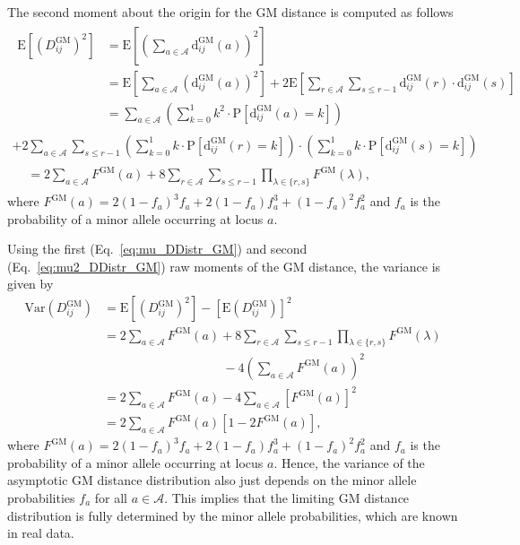 \documentclass[aos]{imsart}
\begin{document}
The second moment about the origin for the GM distance is computed as follows
%
\begin{equation}\label{eq:mu2_DDistr_GM}
\begin{split}
\begin{aligned}
\text{E}\left[\left(D^\text{GM}_{ij}\right)^2\right] &= \text{E}\left[\left(\sum_{a \in \mathcal{A}} \text{d}^\text{GM}_{ij}(a)\right)^2\right] \\
&= \text{E}\left[\sum_{a \in \mathcal{A}} \left(\text{d}^\text{GM}_{ij}(a)\right)^2\right] + 2 \text{E}\left[\sum_{r \in \mathcal{A}} \sum_{s \leq r - 1} \text{d}^\text{GM}_{ij}(r) \cdot \text{d}^\text{GM}_{ij}(s)\right] \\
&= \sum_{a \in \mathcal{A}} \left(\sum_{k = 0}^{1} k^2 \cdot \text{P}\left[\text{d}^\text{GM}_{ij}(a) = k\right]\right)
\end{aligned}\\
+ 2\sum_{a \in \mathcal{A}} \sum_{s \leq r - 1} \left(\sum_{k = 0}^{1} k \cdot \text{P}\left[\text{d}^\text{GM}_{ij}(r) = k\right]\right) \cdot \left(\sum_{k = 0}^{1} k \cdot \text{P}\left[\text{d}^\text{GM}_{ij}(s) = k\right]\right) \\
\begin{aligned}
&= 2\sum_{a \in \mathcal{A}} F^\text{GM}(a) + 8 \sum_{r \in \mathcal{A}} \sum_{s \leq r - 1} \prod_{\lambda \in \{r,s\}} F^\text{GM}(\lambda),
\end{aligned}
\end{split}
\end{equation}
%
where $F^\text{GM}(a) = 2(1 - f_a)^3f_a + 2(1 - f_a)f^3_a + (1 - f_a)^2f^2_a$ and $f_a$ is the probability of a minor allele occurring at locus $a$.

Using the first (Eq.~\ref{eq:mu_DDistr_GM}) and second (Eq.~\ref{eq:mu2_DDistr_GM}) raw moments of the GM distance, the variance is given by
%
\begin{equation}\label{eq:var_DDistr_GM}
\begin{aligned}
\text{Var}\left(D^\text{GM}_{ij}\right) &= \text{E}\left[\left(D^\text{GM}_{ij}\right)^2\right] - \left[\text{E}\left(D^\text{GM}_{ij}\right)\right]^2 \\
&= 2\sum_{a \in \mathcal{A}} F^\text{GM}(a) + 8\sum_{r \in \mathcal{A}} \sum_{s \leq r - 1} \prod_{\lambda \in \{r,s\}} F^\text{GM}(\lambda) \\
&\hspace{4cm}- 4\left(\sum_{a \in \mathcal{A}}F^\text{GM}(a)\right)^2 \\
&= 2\sum_{a \in \mathcal{A}} F^\text{GM}(a) - 4\sum_{a \in \mathcal{A}}\left[F^\text{GM}(a)\right]^2 \\
&= 2\sum_{a \in \mathcal{A}} F^\text{GM}(a)[1 - 2F^\text{GM}(a)],
\end{aligned}
\end{equation}
%
where $F^\text{GM}(a) = 2(1 - f_a)^3f_a + 2(1 - f_a)f^3_a + (1 - f_a)^2f^2_a$ and $f_a$ is the probability of a minor allele occurring at locus $a$. Hence, the variance of the asymptotic GM distance distribution also just depends on the minor allele probabilities $f_a$ for all $a \in \mathcal{A}$. This implies that the limiting GM distance distribution is fully determined by the minor allele probabilities, which are known in real data.
\end{document}
